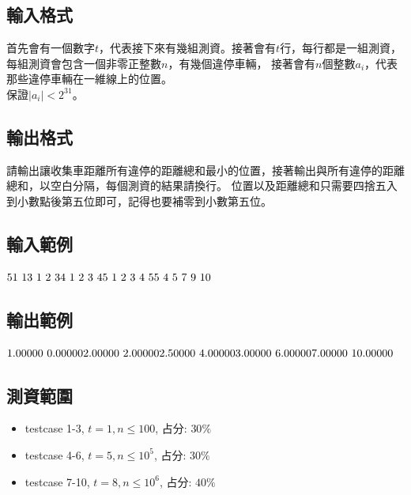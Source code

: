 \documentclass{article}
\begin{document}
\begin{CJK*}{UTF8}{bsmi}
\subsection*{輸入格式}
首先會有一個數字$t$，代表接下來有幾組測資。接著會有$t$行，每行都是一組測資，每組測資會包含一個非零正整數$n$，有幾個違停車輛，
接著會有$n$個整數$a_i$，代表那些違停車輛在一維線上的位置。\\
保證$\lvert a_i\rvert <2^{31}$。

\subsection*{輸出格式}
請輸出讓收集車距離所有違停的距離總和最小的位置，接著輸出與所有違停的距離總和，以空白分隔，每個測資的結果請換行。
位置以及距離總和只需要四捨五入到小數點後第五位即可，記得也要補零到小數第五位。

\subsection*{輸入範例}
$5\\1\ 1\\3\ 1\ 2\ 3\\4\ 1\ 2\ 3\ 4\\5\ 1\ 2\ 3\ 4\ 5\\5\ 4\ 5\ 7\ 9\ 10$

\subsection*{輸出範例}
$1.00000\ 0.00000\\2.00000\ 2.00000\\2.50000\ 4.00000\\3.00000\ 6.00000\\7.00000\ 10.00000$

\subsection*{測資範圍}
\begin{itemize}
    \item testcase 1-3, $t=1,n\leq100$, 占分: $30\%$
    \item testcase 4-6, $t=5,n\leq10^5$, 占分: $30\%$
    \item testcase 7-10, $t=8, n\leq10^6$, 占分: $40\%$
\end{itemize}

\end{CJK*}
\end{document}
